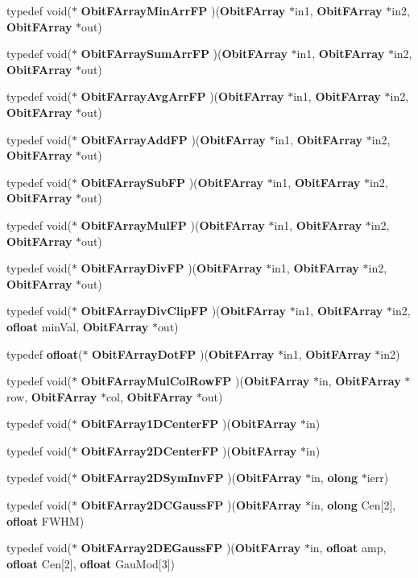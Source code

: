 \begin{CompactItemize}
\item 
typedef void($\ast$ {\bf Obit\-FArray\-Min\-Arr\-FP} )({\bf Obit\-FArray} $\ast$in1, {\bf Obit\-FArray} $\ast$in2, {\bf Obit\-FArray} $\ast$out)
\item 
typedef void($\ast$ {\bf Obit\-FArray\-Sum\-Arr\-FP} )({\bf Obit\-FArray} $\ast$in1, {\bf Obit\-FArray} $\ast$in2, {\bf Obit\-FArray} $\ast$out)
\item 
typedef void($\ast$ {\bf Obit\-FArray\-Avg\-Arr\-FP} )({\bf Obit\-FArray} $\ast$in1, {\bf Obit\-FArray} $\ast$in2, {\bf Obit\-FArray} $\ast$out)
\item 
typedef void($\ast$ {\bf Obit\-FArray\-Add\-FP} )({\bf Obit\-FArray} $\ast$in1, {\bf Obit\-FArray} $\ast$in2, {\bf Obit\-FArray} $\ast$out)
\item 
typedef void($\ast$ {\bf Obit\-FArray\-Sub\-FP} )({\bf Obit\-FArray} $\ast$in1, {\bf Obit\-FArray} $\ast$in2, {\bf Obit\-FArray} $\ast$out)
\item 
typedef void($\ast$ {\bf Obit\-FArray\-Mul\-FP} )({\bf Obit\-FArray} $\ast$in1, {\bf Obit\-FArray} $\ast$in2, {\bf Obit\-FArray} $\ast$out)
\item 
typedef void($\ast$ {\bf Obit\-FArray\-Div\-FP} )({\bf Obit\-FArray} $\ast$in1, {\bf Obit\-FArray} $\ast$in2, {\bf Obit\-FArray} $\ast$out)
\item 
typedef void($\ast$ {\bf Obit\-FArray\-Div\-Clip\-FP} )({\bf Obit\-FArray} $\ast$in1, {\bf Obit\-FArray} $\ast$in2, {\bf ofloat} min\-Val, {\bf Obit\-FArray} $\ast$out)
\item 
typedef {\bf ofloat}($\ast$ {\bf Obit\-FArray\-Dot\-FP} )({\bf Obit\-FArray} $\ast$in1, {\bf Obit\-FArray} $\ast$in2)
\item 
typedef void($\ast$ {\bf Obit\-FArray\-Mul\-Col\-Row\-FP} )({\bf Obit\-FArray} $\ast$in, {\bf Obit\-FArray} $\ast$row, {\bf Obit\-FArray} $\ast$col, {\bf Obit\-FArray} $\ast$out)
\item 
typedef void($\ast$ {\bf Obit\-FArray1DCenter\-FP} )({\bf Obit\-FArray} $\ast$in)
\item 
typedef void($\ast$ {\bf Obit\-FArray2DCenter\-FP} )({\bf Obit\-FArray} $\ast$in)
\item 
typedef void($\ast$ {\bf Obit\-FArray2DSym\-Inv\-FP} )({\bf Obit\-FArray} $\ast$in, {\bf olong} $\ast$ierr)
\item 
typedef void($\ast$ {\bf Obit\-FArray2DCGauss\-FP} )({\bf Obit\-FArray} $\ast$in, {\bf olong} Cen[2], {\bf ofloat} FWHM)
\item 
typedef void($\ast$ {\bf Obit\-FArray2DEGauss\-FP} )({\bf Obit\-FArray} $\ast$in, {\bf ofloat} amp, {\bf ofloat} Cen[2], {\bf ofloat} Gau\-Mod[3])

\end{CompactItemize}
